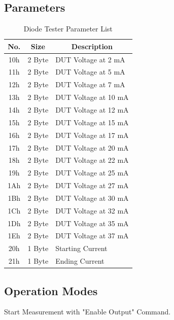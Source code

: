 \subsection{Parameters}
\begin{table}[H]
    \centering
    \begin{tabular}{|c|c|l|}
        \hline
        \textbf{No.}   &   \textbf{Size} & \multicolumn{1}{|c|}{\textbf{Description}}\\ \hline \hline
        10h   &  2 Byte & DUT Voltage at 2 mA \\ \hline
		11h   &  2 Byte & DUT Voltage at 5 mA \\ \hline
		12h   &  2 Byte & DUT Voltage at 7 mA \\ \hline
		13h   &  2 Byte & DUT Voltage at 10 mA \\ \hline
		14h   &  2 Byte & DUT Voltage at 12 mA \\ \hline
		15h   &  2 Byte & DUT Voltage at 15 mA \\ \hline
		16h   &  2 Byte & DUT Voltage at 17 mA \\ \hline
		17h   &  2 Byte & DUT Voltage at 20 mA \\ \hline
		18h   &  2 Byte & DUT Voltage at 22 mA \\ \hline
		19h   &  2 Byte & DUT Voltage at 25 mA \\ \hline
		1Ah   &  2 Byte & DUT Voltage at 27 mA \\ \hline
		1Bh   &  2 Byte & DUT Voltage at 30 mA \\ \hline
		1Ch   &  2 Byte & DUT Voltage at 32 mA \\ \hline
		1Dh   &  2 Byte & DUT Voltage at 35 mA \\ \hline
		1Eh   &  2 Byte & DUT Voltage at 37 mA \\ \hline
		20h   &  1 Byte & Starting Current	\\ \hline
		21h   &  1 Byte & Ending Current \\ \hline
    \end{tabular}
	\caption{Diode Tester Parameter List}
\label{tab:Par-Diode}
\end{table}
\subsection{Operation Modes}
Start Measurement with "Enable Output" Command.

